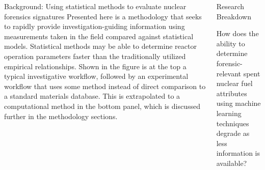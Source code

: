 \documentclass{beamer}
\begin{document}
\begin{frame}[t]{}
\begin{columns}
\begin{column}[T]{0.27\textwidth}
\begin{block}{Background: Using statistical methods to evaluate nuclear forensics signatures}
Presented here is a methodology that seeks to rapidly provide
investigation-guiding information using measurements taken in the field
compared against statistical models.  Statistical methods may be able to
determine reactor operation parameters faster than the traditionally utilized
empirical relationships. Shown in the figure is at the top a typical
investigative workflow, followed by an experimental workflow that uses some
method instead of direct comparison to a standard materials database.  This is
extrapolated to a computational method in the bottom panel, which is discussed
further in the methodology sections.

\end{block}
\end{column}

\begin{column}[T]{0.72\textwidth}
\begin{columns}[t]
\begin{column}{0.15\textwidth}
\begin{block}{Research Breakdown}

How does the ability to determine forensic-relevant spent nuclear fuel
attributes using machine learning techniques degrade as less information is
available?\\~\\


\end{block}
\end{column}
\end{columns}
\end{column}
\end{columns}
\end{frame}
\end{document}
